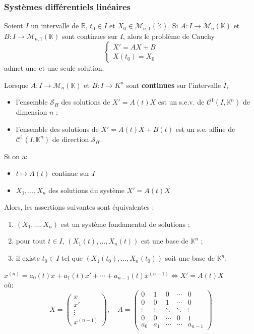 \documentclass[a4paper,12pt]{report}
\newcommand{\Thm}[2]{\begin{tcolorbox}[colback=white,colframe=Red!60, title=Théorème : #1]#2\end{tcolorbox}}
\newcommand{\Methode}[2]{\begin{tcolorbox}[colback=white, title=Méthode :  #1]#2\end{tcolorbox}}
\def\K{\mathbb{K}}
\newcommand{\ssi}{\Longleftrightarrow}
\begin{document}
\subsubsection{Systèmes différentiels linéaires}

\Thm{Cauchy linéaire}{
Soient $I$ un intervalle de $\mathbb{R}$, $t_0 \in I$ et $X_0 \in \mathcal{M}_{n,1}(\K)$.
Si $A : I \to \mathcal{M}_n(\K)$ et $B : I \to \mathcal{M}_{n,1}(\K)$ sont continues sur $I$,
alors le problème de Cauchy
\[
\begin{cases}
X' = AX + B \\
X(t_0) = X_0
\end{cases}
\]
admet une et une seule solution.
}

\Thm{Structure des solutions}{
Lorsque $A : I \to \mathcal{M}_n(\K)$ et $B : I \to K^n$ sont \textbf{continues} sur l’intervalle $I$,
\begin{itemize}
    \item l’ensemble $\mathcal{S}_H$ des solutions de $X' = A(t)X$ est un s.e.v. de $\mathcal{C}^1(I, \K^n)$ de dimension $n$ ;
    \item l’ensemble des solutions de $X' = A(t)X + B(t)$ est un s.e. affine de $\mathcal{C}^1(I, \K^n)$ de direction $\mathcal{S}_H$.
\end{itemize}
}

\Thm{Caractérisation du système fondamentale (sans wronskien)}{
Si on a:
\begin{itemize}
\item $t\mapsto A(t)$ continue sur $I$
\item $X_1, \dots, X_n$ des solutions du système $X' = A(t)X$
\end{itemize}
Alors, les assertions suivantes sont équivalentes :
\begin{enumerate}
    \item $(X_1, \dots, X_n)$ est un système fondamental de solutions ;
    \item pour tout $t \in I$, $(X_1(t), \dots, X_n(t))$ est une base de $\K^n$ ;
    \item il existe $t_0 \in I$ tel que $(X_1(t_0), \dots, X_n(t_0))$ soit une base de $\K^n$.
\end{enumerate}
}

\Methode{Transformation d'une équation différentielle linéaire d'ordre $n$ en une équation matricielle}{
$x^{(n)} = a_0(t)x + a_1(t)x' + \cdots + a_{n-1}(t)x^{(n-1)} \ssi X' = A(t)X$\\
où:
\[
X =
\begin{pmatrix}
x \\
x' \\
\vdots \\
x^{(n-1)}
\end{pmatrix}, \quad
A =
\begin{pmatrix}
0      & 1      & 0      & \cdots & 0      \\
0      & 0      & 1      & \cdots & 0      \\
\vdots & \vdots & \ddots & \ddots & \vdots \\
0      & 0      & \cdots & 0      & 1      \\
a_0   & a_1   & \cdots & \cdots & a_{n-1}
\end{pmatrix}
\]
}
\end{document}
